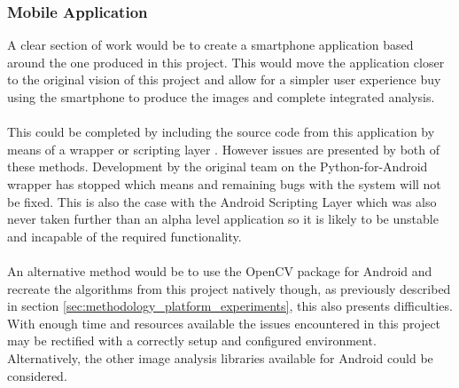 		\subsubsection{Mobile Application}
			A clear section of work would be to create a smartphone application based around the one produced in this project. This would move the application closer to the original vision of this project and allow for a simpler user experience buy using the smartphone to produce the images and complete integrated analysis.
			\\\\
			This could be completed by including the source code from this application by means of a wrapper \citep{kivy2015python} or scripting layer \citep{asl}. However issues are presented by both of these methods. Development by the original team on the Python-for-Android wrapper has stopped which means and remaining bugs with the system will not be fixed. This is also the case with the Android Scripting Layer which was also never taken further than an alpha level application so it is likely to be unstable and incapable of the required functionality.
			\\\\
			An alternative method would be to use the OpenCV package for Android and recreate the algorithms from this project natively though, as previously described in section \ref{sec:methodology_platform_experiments}, this also presents difficulties. With enough time and resources available the issues encountered in this project may be rectified with a correctly setup and configured environment. Alternatively, the other image analysis libraries available for Android could be considered.
